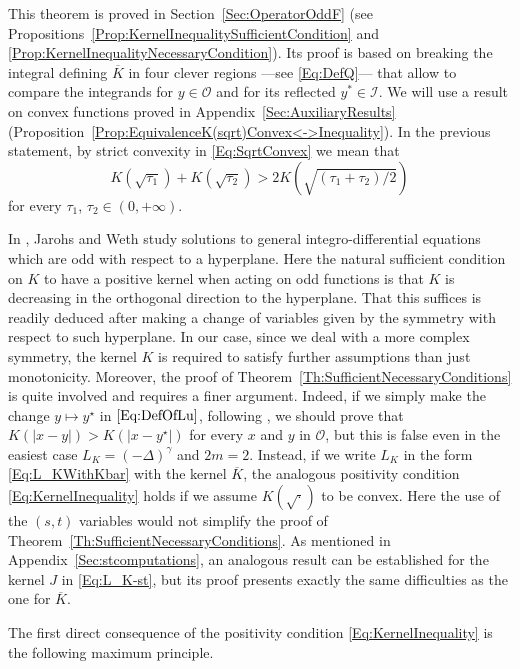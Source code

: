 \documentclass[12pt,reqno]{amsart}
\theoremstyle{definition}
\theoremstyle{remark}
\newcommand{\ical}{\mathcal{I}}
\newcommand{\ocal}{\mathcal{O}}
\newcommand{\s}{\gamma}
\newcommand{\fraclaplacian}{(-\Delta)^\s}
\numberwithin{equation}{section}
\begin{document}
This theorem is proved in Section~\ref{Sec:OperatorOddF} (see Propositions~\ref{Prop:KernelInequalitySufficientCondition} and \ref{Prop:KernelInequalityNecessaryCondition}). Its proof is based on breaking the integral defining $\overline{K}$ in four clever regions ---see \eqref{Eq:DefQ}--- that allow to compare the integrands for $y\in \ocal$ and for its reflected $y^*\in \ical$. We will use a result on convex functions proved in Appendix~\ref{Sec:AuxiliaryResults} (Proposition~\ref{Prop:EquivalenceK(sqrt)Convex<->Inequality}). In the previous statement, by strict convexity in \eqref{Eq:SqrtConvex} we mean that
$$
K(\sqrt{\tau_1}) + K(\sqrt{\tau_2}) > 2 K(\sqrt{(\tau_1 + \tau_2)/2})
$$
for every $\tau_1$, $\tau_2 \in (0,+\infty)$.

In \cite{JarohsWeth}, Jarohs and Weth study solutions to general integro-differential equations which are odd with respect to a hyperplane. Here the natural sufficient condition on $K$ to have a positive kernel when acting on odd functions is that $K$ is decreasing in the orthogonal direction to the hyperplane. That this suffices is readily deduced after making a change of variables given by the symmetry with respect to such hyperplane. In our case, since we deal with a more complex symmetry, the kernel $K$ is required to satisfy further assumptions than just monotonicity. Moreover, the proof of Theorem~\ref{Th:SufficientNecessaryConditions} is quite involved and requires a finer argument. Indeed, if we simply make the change $y \mapsto y^\star$ in $\eqref{Eq:DefOfLu}$, following \cite{JarohsWeth}, we should prove that $K(|x-y|) > K(|x-y^\star|)$ for every $x$ and $y$ in $\ocal$, but this is false even in the easiest case $L_K = \fraclaplacian$ and $2m=2$. Instead, if we write $L_K$ in the form \eqref{Eq:L_KWithKbar} with the kernel $\overline{K}$, the analogous positivity condition \eqref{Eq:KernelInequality} holds if we assume $K(\sqrt{\cdot})$ to be convex. Here the use of the $(s,t)$ variables would not simplify the proof of Theorem~\ref{Th:SufficientNecessaryConditions}. As mentioned in Appendix~\ref{Sec:stcomputations}, an analogous result can be established for the kernel $J$ in \eqref{Eq:L_K-st}, but its proof presents exactly the same difficulties as the one for $\overline{K}$.


The first direct consequence of the positivity condition \eqref{Eq:KernelInequality} is the following maximum principle.
\end{document}

